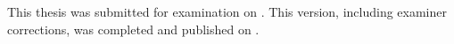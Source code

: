 \vspace{6mm}
\noindent
This thesis was submitted for examination on \submittedversiondate. This version, including examiner corrections, was completed and published on \finalversiondate.














































